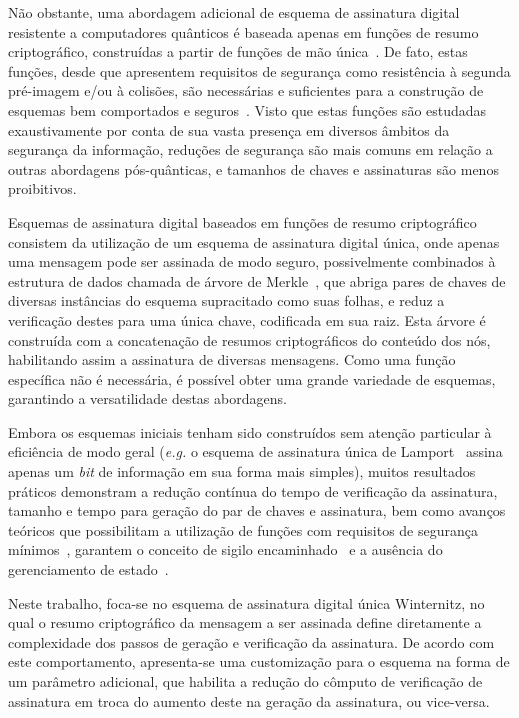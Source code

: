 \documentclass{ufsctex/ufsctex}
\begin{document}
Não obstante, uma abordagem adicional de esquema de assinatura digital
resistente a computadores quânticos é baseada apenas em funções de resumo
criptográfico, construídas a partir de funções de mão
única~\cite{Katz:misc:2005:sep}. De fato, estas funções, desde que
apresentem requisitos de segurança como resistência à segunda pré-imagem e/ou à
colisões, são necessárias e suficientes para a construção de esquemas bem
comportados e seguros~\cite{Rompel:inproc:1990:may}. Visto que estas
funções são estudadas exaustivamente por conta de sua vasta presença em
diversos âmbitos da segurança da informação, reduções de segurança são mais
comuns em relação a outras abordagens pós-quânticas, e tamanhos de chaves e
assinaturas são menos proibitivos.

Esquemas de assinatura digital baseados em funções de resumo criptográfico
consistem da utilização de um esquema de assinatura digital única, onde apenas
uma mensagem pode ser assinada de modo seguro, possivelmente combinados à
estrutura de dados chamada de árvore de
Merkle~\cite{Merkle:inproc:1989:aug}, que abriga pares de chaves de
diversas instâncias do esquema supracitado como suas folhas, e reduz a
verificação destes para uma única chave, codificada em sua raiz. Esta árvore é
construída com a concatenação de resumos criptográficos do conteúdo dos nós,
habilitando assim a assinatura de diversas mensagens. Como uma função
específica não é necessária, é possível obter uma grande variedade de esquemas,
garantindo a versatilidade destas abordagens.

Embora os esquemas iniciais tenham sido construídos sem atenção particular à
eficiência de modo geral (\emph{e.g.} o esquema de assinatura única de
Lamport~\cite{Lamport:report:1979:oct} assina apenas um \emph{bit} de
informação em sua forma mais simples), muitos resultados práticos demonstram a
redução contínua do tempo de verificação da assinatura, tamanho e tempo para
geração do par de chaves e assinatura, bem como avanços teóricos que
possibilitam a utilização de funções com requisitos de segurança
mínimos~\cite{Huelsing:inproc:2013:jun}, garantem o conceito de sigilo
encaminhado~\cite{Buchmann:inproc:2011:nov} e a ausência do
gerenciamento de estado~\cite{Bernstein:inproc:2015:apr}.

Neste trabalho, foca-se no esquema de assinatura digital única Winternitz, no
qual o resumo criptográfico da mensagem a ser assinada define diretamente a
complexidade dos passos de geração e verificação da assinatura. De acordo com
este comportamento, apresenta-se uma customização para o esquema na forma de um
parâmetro adicional, que habilita a redução do cômputo de verificação de
assinatura em troca do aumento deste na geração da assinatura, ou vice-versa.
\end{document}
